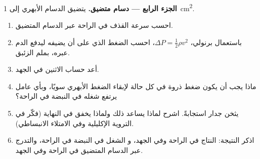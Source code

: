 \begin{problem}
\medskip
\noindent\textbf{الجزء الرابع --- دسام متضيق.}
يتضيق الدسام الأبهري إلى \qty{1}{cm^2}.
\begin{enumerate}[resume]
  \item احسب سرعة القذف في الراحة عبر الدسام
        المتضيق.
  \item باستعمال برنولي، $\Delta P = \tfrac12\rho v^{2}$، احسب
        الضغط الذي على  أن يضيفه ليدفع الدم عبره،
        بملم الزئبق.
  \item أعد حساب الاثنين في الجهد.
  \item ماذا يجب أن يكون ضغط ذروة  في كل حالة
        لإبقاء الضغط الأبهري سويًا، وبأي عامل يرتفع
        شغله في النبضة في الراحة؟
  \item يثخن جدار  استجابةً. اشرح لماذا يساعد ذلك
        ولماذا يخفق في النهاية (فكّر في التروية
        الإكليلية وفي الامتلاء الانبساطي).
  \item اذكر النتيجة: النتاج في الراحة وفي الجهد، و
        الشغل في النبضة في الراحة، والتدرج عبر الدسام
        المتضيق في الراحة وفي الجهد.
\end{enumerate}
\end{problem}
